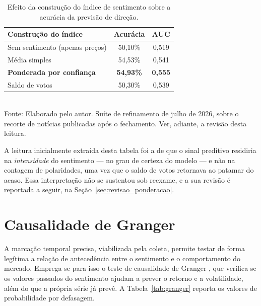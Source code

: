 \begin{table}[htpb]
\centering
\caption{Efeito da construção do índice de sentimento sobre a acurácia da previsão de direção.}
\label{tab:ism_ponderado}
\begin{tabular}{lcc}
\hline
\textbf{Construção do índice} & \textbf{Acurácia} & \textbf{AUC} \\ \hline
Sem sentimento (apenas preços) & 50,10\% & 0,519 \\
Média simples & 54,53\% & 0,541 \\
\textbf{Ponderada por confiança} & \textbf{54,93\%} & \textbf{0,555} \\
Saldo de votos & 50,30\% & 0,539 \\ \hline
\end{tabular}
\vspace{0.2cm}
{\small \\ Fonte: Elaborado pelo autor. Suíte de refinamento de julho de 2026, sobre o recorte de notícias publicadas após o fechamento. Ver, adiante, a revisão desta leitura.}
\end{table}

A leitura inicialmente extraída desta tabela foi a de que o sinal preditivo residiria na \emph{intensidade} do sentimento --- no grau de certeza do modelo --- e não na contagem de polaridades, uma vez que o saldo de votos retornava ao patamar do acaso. Essa interpretação não se sustentou sob reexame, e a sua revisão é reportada a seguir, na Seção~\ref{sec:revisao_ponderacao}.

\section{Causalidade de Granger}

A marcação temporal precisa, viabilizada pela coleta, permite testar de forma legítima a relação de antecedência entre o sentimento e o comportamento do mercado. Emprega-se para isso o teste de causalidade de Granger \cite{granger_investigating_1969}, que verifica se os valores passados do sentimento ajudam a prever o retorno e a volatilidade, além do que a própria série já prevê. A Tabela~\ref{tab:granger} reporta os valores de probabilidade por defasagem.

